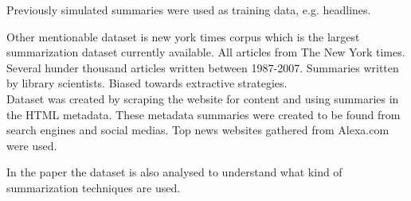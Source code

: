 \documentclass{article}
\begin{document}
Previously simulated summaries were used as training data, e.g. headlines. 

Other mentionable dataset is new york times corpus which is the largest summarization dataset currently available. All articles from The New York times. Several hunder thousand articles written between 1987-2007. Summaries written by library scientists. Biased towards extractive strategies.\\

Dataset was created by scraping the website for content and using summaries in the HTML metadata. These metadata summaries were created to be found from search engines and social medias. Top news websites gathered from Alexa.com were used. 

In the paper \cite{dataset} the dataset is also analysed to understand what kind of summarization techniques are used.



	
\end{document}
